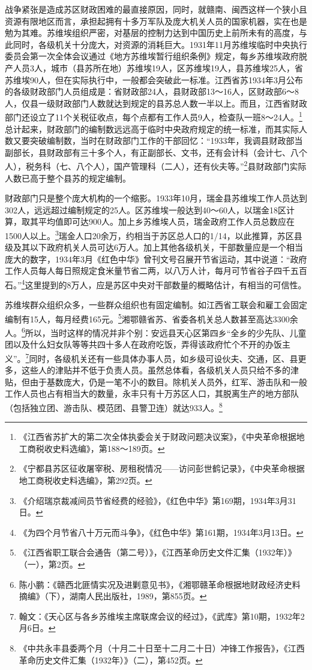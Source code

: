 战争紧张是造成苏区财政困难的最直接原因，同时，就赣南、闽西这样一个狭小且资源有限地区而言，承担起拥有十多万军队及庞大机关人员的国家机器，实在也是勉为其难。苏维埃组织严密，对基层的控制力达到中国历史上前所未有的高度，与此同时，各级机关十分庞大，对资源的消耗巨大。1931年11月苏维埃临时中央执行委员会第一次全体会议通过《地方苏维埃暂行组织条例》规定，每乡苏维埃政府脱产人员3人，城市（县苏所在地）苏维埃19人，区苏维埃19人，县苏维埃25人，省苏维埃90人，但在实际执行中，一般都会突破此一标准。江西省苏1934年3月公布的各级财政部门人员组成是：省财政部24人，县财政部13～16人，区财政部6～8人，仅县一级财政部门人数就达到规定的县苏总人数一半以上。而且，江西省财政部门还设立了11个关税征收点，每个点都有工作人员9人，检查队一班8～24人。\footnote{《江西省苏扩大的第二次全体执委会关于财政问题决议案》，《中央革命根据地工商税收史料选编》，第188～189页。}总计起来，财政部门的编制数远远高于临时中央政府规定的统一标准，而其实际人数又要突破编制数，当时在财政部门工作的干部回忆：“1933年，我调县财政部当副部长，县财政部有三十多个人，有正副部长、文书，还有会计科（会计七、八个人），税务科（七、八个人），国产管理科（二人），还有伙夫等。”\footnote{《宁都县苏区征收屠宰税、房租税情况——访问彭世鹤记录》，《中央革命根据地工商税收史料选编》，第292页。}县财政部门实际人数已高于整个县苏的规定编制。


财政部门只是整个庞大机构的一个缩影。1933年10月，瑞金县苏维埃工作人员达到302人，远远超过编制规定的25人。区苏维埃一般达到40～60人，以瑞金18区计算，取其平均值即可达900人。加上乡苏维埃人员，瑞金政府工作人员总数应在1500人以上。\footnote{《介绍瑞京裁减间员节省经费的经验》，《红色中华》第169期，1934年3月31日。}瑞金人口20余万，约相当于苏区总人口的1/14，以此推算，苏区县级及其以下政府机关人员可达6万人。加上其他各级机关，干部数量应是一个相当庞大的数字，1934年3月《红色中华》曾刊文号召展开节省运动，其中说道：“政府工作人员每人每日照规定食米量节省二两，以八万人计，每月可节省谷子四千五百石。”\footnote{《为四个月节省八十万元而斗争》，《红色中华》第161期，1934年3月13日。}这里提到的8万人，应是苏区中央对干部数量的概略估计，有相当的可信性。


苏维埃群众组织众多，一些群众组织也有固定编制。如江西省工联会和雇工会固定编制有15人，每月经费165元。\footnote{《江西省职工联合会通告（第二号）》，《江西革命历史文件汇集（1932年）》（一），第2页。}湘鄂赣省苏、省委各机关总人数甚至高达3300余人。\footnote{陈小鹏：《赣西北匪情实况及进剿意见书》，《湘鄂赣革命根据地财政经济史料摘编》（下），湖南人民出版社，1989，第855页。}所以，当时这样的情况并非个别：安远县天心区第四乡“全乡的少先队、儿童团以及什么妇女队等等共四十多人在政府吃饭，弄得该政府忙个不开的办饭主义”。\footnote{翰文：《天心区与各乡苏维埃主席联席会议的经过》，《武库》第10期，1932年2月6日。}同时，各级机关还有一些具体办事人员，如乡级可设伙夫、交通，区、县更多，这些人的津贴并不低于负责人员。虽然总体看，各级机关人员只给不多的津贴，但由于基数庞大，仍是一笔不小的数目。除机关人员外，红军、游击队和一般工作人员也占有相当大的数量，永丰只有十万苏区人口，其脱离生产的地方部队（包括独立团、游击队、模范团、县警卫连）就达933人。\footnote{《中共永丰县委两个月（十月二十日至十二月二十日）冲锋工作报告》，《江西革命历史文件汇集（1932年）》（二），第452页。}


